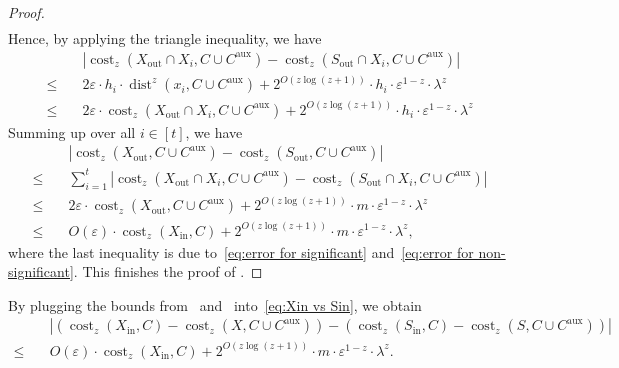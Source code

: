 \documentclass[letterpaper,11pt]{article}
\theoremstyle{plain}
\theoremstyle{definition}
\theoremstyle{remark}
\DeclareMathOperator{\cost}{cost}
\DeclareMathOperator{\dist}{dist}
\newcommand{\inl}{\mathrm{in}}
\newcommand{\out}{\mathrm{out}}
\newcommand{\eps}{\varepsilon}
\newcommand{\aux}{\mathrm{aux}}
\begin{document}
\begin{proof}
\begin{align*}
    \end{align*}
    Hence, by applying the triangle inequality, we have 
    \begin{align*}
        &\quad \left|\cost_z(X_\out\cap X_i,C\cup C^\aux) - \cost_z(S_\out\cap X_i,C\cup C^\aux) \right|\\
        \le&\quad 2\eps\cdot h_i\cdot \dist^z(x_i,C\cup C^\aux) + 2^{O(z\log(z+1))}\cdot h_i\cdot \eps^{1-z}\cdot \lambda^z\\
        \le&\quad 2\eps\cdot \cost_z(X_\out\cap X_i,C\cup C^\aux) + 2^{O(z\log(z+1))}\cdot h_i\cdot \eps^{1-z}\cdot \lambda^z
    \end{align*}
    Summing up over all $i\in [t]$, we have 
    \begin{equation}
        \label{eq:term 2}
        \begin{aligned}    
        &\quad \left|\cost_z(X_\out,C\cup C^\aux) - \cost_z(S_\out,C\cup C^\aux) \right|\\
        \le&\quad \sum_{i=1}^t\left|\cost_z(X_\out\cap X_i, C\cup C^\aux) - \cost_z(S_\out\cap X_i, C\cup C^\aux)\right|\\
        \le&\quad 2\eps\cdot \cost_z(X_\out, C\cup C^\aux) + 2^{O(z\log(z+1))}\cdot m\cdot \eps^{1-z}\cdot \lambda^z\\
        \le&\quad O(\eps)\cdot \cost_z(X_\inl,C) + 2^{O(z\log(z+1))}\cdot m\cdot \eps^{1-z}\cdot \lambda^z,
        \end{aligned} 
    \end{equation}
    where the last inequality is due to~\eqref{eq:error for significant} and~\eqref{eq:error for non-significant}.
    This finishes the proof of .
\end{proof}

By plugging the bounds from~ and~ into~\eqref{eq:Xin vs Sin}, we obtain 
\begin{equation}
    \label{eq:key 2}
    \begin{aligned}    
    &\quad \left|\left(\cost_z(X_\inl,C) - \cost_z(X,C\cup C^\aux) \right) - \left(\cost_z(S_\inl,C) - \cost_z(S,C\cup C^\aux) \right) \right|\\
    \le&\quad O(\eps)\cdot \cost_z(X_\inl,C) + 2^{O(z\log (z+1))}\cdot m\cdot \eps^{1-z}\cdot \lambda^z.
    \end{aligned}
\end{equation}
\end{document}
